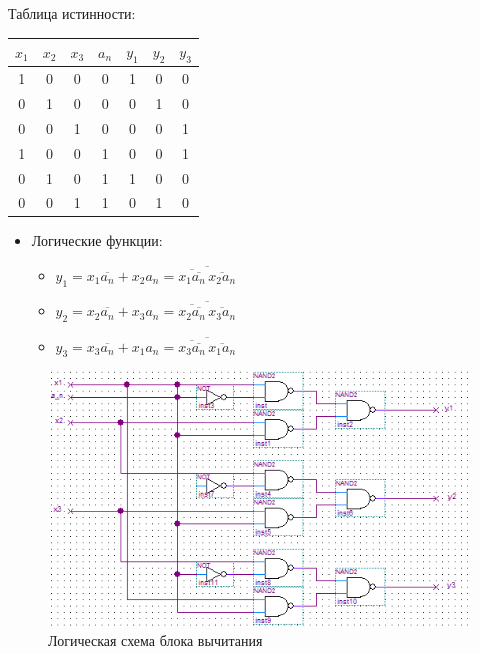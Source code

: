 \documentclass[utf8x, 12pt]{G7-32}
\begin{document}
\bigskip 
Таблица истинности:

\begin{table}[hhh!]
	\begin{center}
		\begin{tabular}{|ccc|c||ccc|}
		\hline
		$x_1$ & $x_2$ & $x_3$ & $a_n$ & $y_1$ & $y_2$ & $y_3$\\
		\hline
		1 & 0 & 0 &		0 &		 1 & 0 & 0  \\
		0 &	1 & 0 &		0 &		 0 & 1 & 0 \\
		0 & 0 & 1 &		0 &		 0 & 0 & 1 \\
		\hline
		1 &	0 & 0 &		1 &		 0 & 0 & 1 \\
		0 &	1 & 0 &		1 &		 1 & 0 & 0 \\	
		0 &	0 & 1 &		1 &		 0 & 1 & 0 \\
		\hline
		\end{tabular}
	\end{center}	
\end{table}


\begin{itemize}
	\item Логические функции:
	\begin{itemize}
		\item $y_1 = x_1 \overline{a_n} + x_2 a_n = \overline{\overline{x_1 \overline{a_n}} \, \overline{x_2 a_n}}$
		\item $y_2 = x_2 \overline{a_n} + x_3 a_n = \overline{\overline{x_2 \overline{a_n}} \, \overline{x_3 a_n}}$
		\item $y_3 = x_3 \overline{a_n} + x_1 a_n = \overline{\overline{x_3 \overline{a_n}} \, \overline{x_1 a_n}}$
	\end{itemize}
\end{itemize}

\begin{figure}[hhh!]
\begin{center}
\includegraphics[width=14cm]{img/SUB}
\end{center}
\vspace{-5mm}\caption{Логическая схема блока вычитания}
\end{figure}
\end{document}
